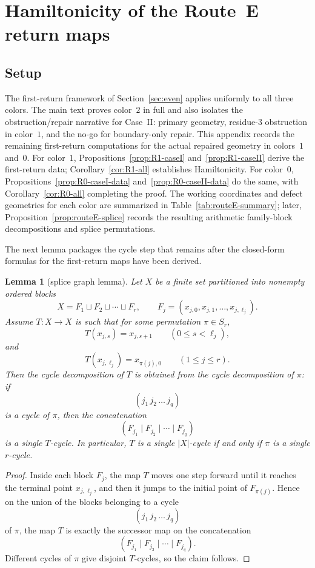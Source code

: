 \documentclass[11pt]{article}
\newtheorem{lemma}{Lemma}
\begin{document}
\section{Hamiltonicity of the Route~E return maps}\label{app:routeE-cycle}

\subsection{Setup}

The first-return framework of Section~\ref{sec:even} applies uniformly to all three colors.
The main text proves color~$2$ in full and also isolates the obstruction/repair narrative for Case~II: primary geometry, residue-$3$ obstruction in color~$1$, and the no-go for boundary-only repair.
This appendix records the remaining first-return computations for the actual repaired geometry in colors~$1$ and~$0$.
For color~$1$, Propositions~\ref{prop:R1-caseI} and~\ref{prop:R1-caseII} derive the first-return data; Corollary~\ref{cor:R1-all} establishes Hamiltonicity.
For color~$0$, Propositions~\ref{prop:R0-caseI-data} and~\ref{prop:R0-caseII-data} do the same, with Corollary~\ref{cor:R0-all} completing the proof.
The working coordinates and defect geometries for each color are summarized in Table~\ref{tab:routeE-summary}; later, Proposition~\ref{prop:routeE-splice} records the resulting arithmetic family-block decompositions and splice permutations.

The next lemma packages the cycle step that remains after the closed-form formulas for the first-return maps have been derived.


\begin{lemma}[splice graph lemma]\label{lem:splice-graph}
Let $X$ be a finite set partitioned into nonempty ordered blocks
\[
X=F_1\sqcup F_2\sqcup \cdots \sqcup F_r,
\qquad
F_j=(x_{j,0},x_{j,1},\dots,x_{j,\ell_j}).
\]
Assume $T:X\to X$ is such that for some permutation $\pi\in S_r$,
\[
T(x_{j,s})=x_{j,s+1}\qquad (0\le s<\ell_j),
\]
and
\[
T(x_{j,\ell_j})=x_{\pi(j),0}\qquad (1\le j\le r).
\]
Then the cycle decomposition of $T$ is obtained from the cycle decomposition of $\pi$: if
\[
(j_1\,j_2\,\dots\,j_q)
\]
is a cycle of $\pi$, then the concatenation
\[
(F_{j_1}\mid F_{j_2}\mid \cdots \mid F_{j_q})
\]
is a single $T$-cycle.
In particular, $T$ is a single $|X|$-cycle if and only if $\pi$ is a single $r$-cycle.
\end{lemma}

\begin{proof}
Inside each block $F_j$, the map $T$ moves one step forward until it reaches the terminal point $x_{j,\ell_j}$, and then it jumps to the initial point of $F_{\pi(j)}$.
Hence on the union of the blocks belonging to a cycle
\[
(j_1\,j_2\,\dots\,j_q)
\]
of $\pi$, the map $T$ is exactly the successor map on the concatenation
\[
(F_{j_1}\mid F_{j_2}\mid \cdots \mid F_{j_q}).
\]
Different cycles of $\pi$ give disjoint $T$-cycles, so the claim follows.
\end{proof}
\end{document}
